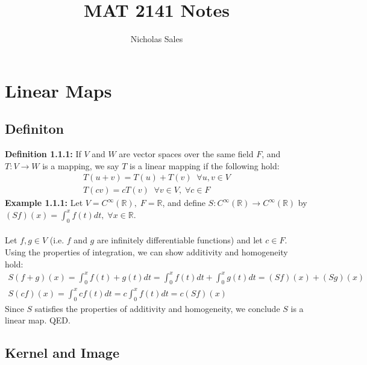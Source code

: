 \documentclass[11pt]{article}
\title{MAT 2141 Notes}
\author{Nicholas Sales}
\date{} %
\begin{document}
\maketitle

\tableofcontents
\newpage

\section{Linear Maps}

\subsection{Definiton}

\textbf{Definition 1.1.1:} If $V$ and $W$ are vector spaces over the same field $F$, and $T : V \rightarrow W$ is a mapping, we say $T$ is a linear mapping if the following hold:
\begin{gather*}
    T(u + v) = T(u) + T(v) \;\; \forall u,v \in V \\
    T(cv) = cT(v) \;\; \forall v \in V, \; \forall c \in F
\end{gather*}
\textbf{Example 1.1.1:} Let $V = C^{\infty}(\mathbb{R}), \; F = \mathbb{R}$, and define $S : C^{\infty}(\mathbb{R}) \rightarrow C^{\infty}(\mathbb{R})$ by $(Sf)(x) = \int_{0}^{x} f(t) dt, \; \forall x \in \mathbb{R}$. \\
\vspace{0.1cm} \\
Let $f, g \in V$ (i.e. $f$ and $g$ are infinitely differentiable functions) and let $c \in F$. Using the properties of integration, we can show additivity and homogeneity hold:
\begin{gather*}
    S(f + g)(x) = \int_{0}^{x} f(t) + g(t) dt = \int_{0}^{x} f(t) dt + \int_{0}^{x} g(t) dt = (Sf)(x) + (Sg)(x) \\
    S(cf)(x) = \int_{0}^{x} cf(t) dt = c \int_{0}^{x} f(t) dt = c(Sf)(x)
\end{gather*}
Since $S$ satisfies the properties of additivity and homogeneity, we conclude $S$ is a linear map. QED.

\subsection{Kernel and Image}
\end{document}
